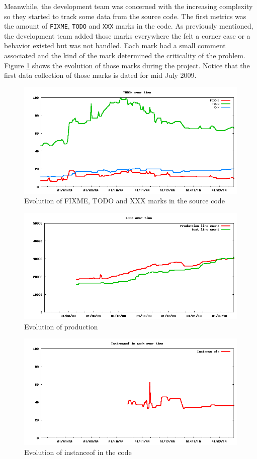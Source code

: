 \documentclass[lnbip]{svmultln}
\begin{document}
Meanwhile, the development team was concerned with the increasing
complexity so they started to track some data from the source
code. The first metrics was the amount of \texttt{FIXME},
\texttt{TODO} and \texttt{XXX} marks in the code. As previously
mentioned, the development team added those marks everywhere the felt
a corner case or a behavior existed but was not handled. Each mark had
a small comment associated and the kind of the mark determined the
criticality of the problem. Figure \ref{fig:TODOs} shows the evolution
of those marks during the project. Notice that the first data
collection of those marks is dated for mid July 2009.

\begin{figure}[hbt]
  \centerline{
    \includegraphics[width=120mm]{TODOs.png}
  }
  \caption{Evolution of FIXME, TODO and XXX marks in the source code}
  \label{fig:TODOs}
\end{figure}

\begin{figure}[hbt]
  \centerline{
    \includegraphics[width=120mm]{LOCs.png}
  }
  \caption{Evolution of production }
  \label{fig:LOCs}
\end{figure}

\begin{figure}[hbt]
  \centerline{
    \includegraphics[width=120mm]{InstanceOfs.png}
  }
  \caption{Evolution of instanceof in the code }
  \label{fig:InstanceOfs}
\end{figure}
\end{document}
